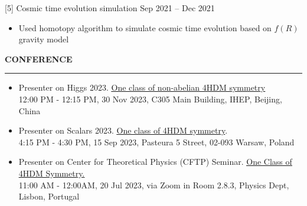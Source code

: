 \documentclass[11pt,letterpaper]{article}
\newcommand{\blue}{\color{blue}}
\begin{document}
\vspace{0.4em}


[5] Cosmic time evolution simulation \hfill Sep 2021 {--} Dec 2021\\
\vspace{-1.8em}
\begin{itemize}
    \itemsep -5pt {}
    \item Used homotopy algorithm to simulate cosmic time evolution based on $f(R)$ gravity model 
\end{itemize}


\vspace{1.6em}


\textbf{\MakeUppercase{Conference}}
\vspace{0.5em}
\hrule
\vspace{-0.3em}

\begin{itemize}
    \itemsep -5pt{}

    \item Presenter on Higgs 2023. \href{https://indico.ihep.ac.cn/event/18025/contributions/141778/}{\underline{\blue One class of non-abelian 4HDM symmetry}} \\ 12:00 PM - 12:15 PM, 30 Nov 2023, C305 Main Building, IHEP, Beijing, China  

    \item Presenter on Scalars 2023. \href{http://indico.fuw.edu.pl/contributionDisplay.py?sessionId=23&contribId=3&confId=66}{\underline{\blue One class of 4HDM symmetry}}.  \\ 4:15 PM - 4:30 PM, 15 Sep 2023, Pasteura 5 Street, 02-093 Warsaw, Poland

    \item Presenter on Center for Theoretical Physics (CFTP) Seminar. \href{https://youtu.be/7Pcd3ZNM3FA}{\underline{\blue One Class of 4HDM Symmetry.}} \\ 11:00 AM - 12:00AM, 20 Jul 2023, via Zoom in Room 2.8.3, Physics Dept, Lisbon, Portugal 
\end{itemize}

\vspace{1.6em}
\end{document}
